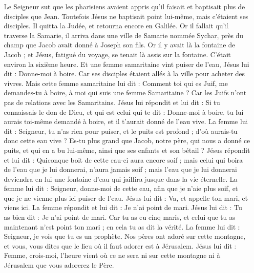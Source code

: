 \begin{multicols}{2}
\VerseOne{}Le Seigneur sut que les pharisiens avaient appris qu'il faisait et baptisait plus de disciples que Jean.
Toutefois Jésus ne baptisait point lui-même, mais c'étaient ses disciples.
Il quitta la Judée, et retourna encore en Galilée.
Or il fallait qu'il traverse la Samarie,
il arriva dans une ville de Samarie nommée Sychar, près du champ que Jacob avait donné à Joseph son fils.
Or il y avait là la fontaine de Jacob ; et Jésus, fatigué du voyage, se tenait là assis sur la fontaine. C'était environ la sixième heure.
Et une femme samaritaine vint puiser de l'eau, Jésus lui dit : Donne-moi à boire.
Car ses disciples étaient allés à la ville pour acheter des vivres.
Mais cette femme samaritaine lui dit : Comment toi qui es Juif, me demandes-tu à boire, à moi qui suis une femme Samaritaine ? Car les Juifs n'ont pas de relations avec les Samaritains.
Jésus lui répondit et lui dit : Si tu connaissais le don de Dieu, et qui est celui qui te dit : Donne-moi à boire, tu lui aurais toi-même demandé à boire, et il t'aurait donné de l'eau vive.
La femme lui dit : Seigneur, tu n'as rien pour puiser, et le puits est profond ; d'où aurais-tu donc cette eau vive ?
Es-tu plus grand que Jacob, notre père, qui nous a donné ce puits, et qui en a bu lui-même, ainsi que ses enfants et son bétail ?
Jésus répondit et lui dit : Quiconque boit de cette eau-ci aura encore soif ;
mais celui qui boira de l'eau que je lui donnerai, n'aura jamais soif ; mais l'eau que je lui donnerai deviendra en lui une fontaine d'eau qui jaillira jusque dans la vie éternelle.
La femme lui dit : Seigneur, donne-moi de cette eau, afin que je n'aie plus soif, et que je ne vienne plus ici puiser de l'eau.
Jésus lui dit : Va, et appelle ton mari, et viens ici.
La femme répondit et lui dit : Je n'ai point de mari. Jésus lui dit : Tu as bien dit : Je n'ai point de mari.
Car tu as eu cinq maris, et celui que tu as maintenant n'est point ton mari ; en cela tu as dit la vérité.
La femme lui dit : Seigneur, je vois que tu es un prophète.
Nos pères ont adoré sur cette montagne, et vous, vous dites que le lieu où il faut adorer est à Jérusalem.
Jésus lui dit : Femme, crois-moi, l'heure vient où ce ne sera ni sur cette montagne ni à Jérusalem que vous adorerez le Père.

\end{multicols}
